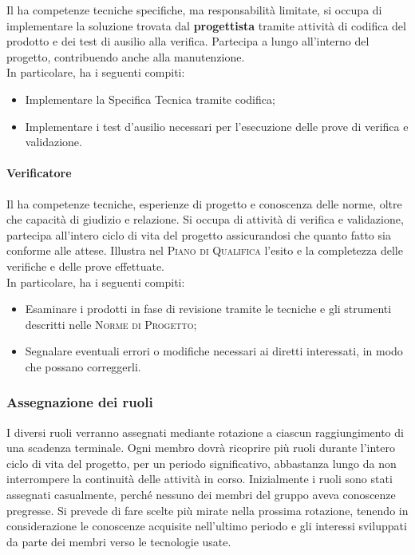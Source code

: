 Il \textbf{} ha competenze tecniche specifiche, ma responsabilità limitate, si occupa di 
implementare la soluzione trovata dal \textbf{progettista} tramite attività di codifica del prodotto e dei test di 
ausilio alla verifica. Partecipa a lungo all'interno del progetto, contribuendo anche alla manutenzione.\\
In particolare, ha i seguenti compiti:
\begin{itemize}
    \item Implementare la Specifica Tecnica tramite codifica;
    \item Implementare i test d'ausilio necessari per l'esecuzione delle prove di verifica e validazione.
\end{itemize}

\paragraph{Verificatore}

Il \textbf{} ha competenze tecniche, esperienze di progetto e conoscenza delle norme, oltre che 
capacità di giudizio e relazione. Si occupa di attività di verifica e validazione, partecipa all'intero ciclo di vita 
del progetto assicurandosi che quanto fatto sia conforme alle attese. Illustra nel \textsc{Piano di Qualifica} l'esito 
e la completezza delle verifiche e delle prove effettuate.\\
In particolare, ha i seguenti compiti:
\begin{itemize}
    \item Esaminare i prodotti in fase di revisione tramite le tecniche e gli strumenti descritti nelle \textsc{Norme di Progetto};
    \item Segnalare eventuali errori o modifiche necessari ai diretti interessati, in modo che possano correggerli.
\end{itemize}

\subsubsection{Assegnazione dei ruoli}

I diversi ruoli verranno assegnati mediante rotazione a ciascun raggiungimento di una scadenza terminale. Ogni membro 
dovrà ricoprire più ruoli durante l'intero ciclo di vita del progetto, per un periodo significativo, abbastanza lungo 
da non interrompere la continuità delle attività in corso. Inizialmente i ruoli sono stati assegnati casualmente, 
perché nessuno dei membri del gruppo aveva conoscenze pregresse. Si prevede di fare scelte più mirate nella prossima 
rotazione, tenendo in considerazione le conoscenze acquisite nell'ultimo periodo e gli interessi sviluppati da parte 
dei membri verso le tecnologie usate.

